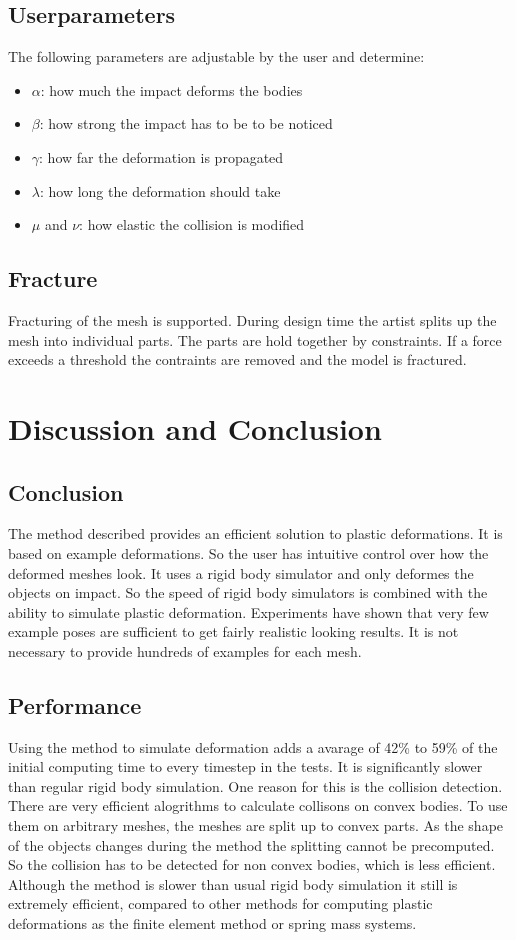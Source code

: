 \documentclass[
	11pt, 
	DIV10,
	a4paper, 
	oneside, 
	headings=normal, 
	captions=tableheading,
	final, 
	numbers=noenddot
]{scrartcl}
\begin{document}
\subsection{Userparameters}
The following parameters are adjustable by the user and determine:
\begin{itemize}
	\item $\alpha$: how much the impact deforms the bodies
	\item $\beta$: how strong the impact has to be to be noticed
	\item $\gamma$: how far the deformation is propagated
	\item $\lambda$: how long the deformation should take
	\item $\mu$ and $\nu$: how elastic the collision is modified
\end{itemize}
\subsection{Fracture}
Fracturing of the mesh is supported. During design time the artist splits up the mesh into individual parts. 
The parts are hold together by constraints. If a force exceeds a threshold the contraints are removed and the model is fractured.
\section{Discussion and Conclusion}
\subsection{Conclusion}
The method described provides an efficient solution to plastic deformations. It is based on example deformations. So the user has intuitive control over how the deformed meshes look. It uses a rigid body simulator and only deformes the objects on impact. So the speed of rigid body simulators is combined with the ability to simulate plastic deformation. Experiments have shown that very few example poses are sufficient to get fairly realistic looking results. It is not necessary to provide hundreds of examples for each mesh.
\subsection{Performance}
Using the method to simulate deformation adds a avarage of 42\% to 59\% of the initial computing time to every timestep in the tests. It is significantly slower than regular rigid body simulation. One reason for this is the collision detection. There are very efficient alogrithms to calculate collisons on convex bodies. To use them on arbitrary meshes, the meshes are split up to convex parts. As the shape of the objects changes during the method the splitting cannot be precomputed. So the collision has to be detected for non convex bodies, which is less efficient.\\
Although the method is slower than usual rigid body simulation it still is extremely efficient, compared to other methods for computing plastic deformations as the finite element method or spring mass systems.
\end{document}
